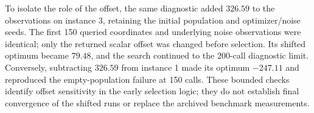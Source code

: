 To isolate the role of the offset, the same diagnostic added $326.59$ to
the observations on instance 3, retaining the initial population and
optimizer/noise seeds. The first 150 queried coordinates and underlying
noise observations were identical; only the returned scalar offset was
changed before selection. Its shifted optimum became $79.48$, and the search continued
to the 200-call diagnostic limit. Conversely, subtracting $326.59$ from
instance 1 made its optimum $-247.11$ and reproduced the empty-population
failure at 150 calls. These bounded checks identify offset sensitivity in
the early selection logic; they do not establish final convergence of the
shifted runs or replace the archived benchmark measurements.
